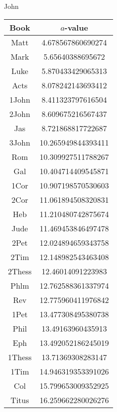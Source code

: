 \documentclass[12pt,letterpaper]{article}
\begin{document}
John
\begin{longtable}{|c|c|}
\hline
 Book & $a$-value \\ \hline
Matt & 4.678567860690274 \\ \hline
 Mark & 5.65640388695672 \\ \hline
 Luke & 5.870433429065313 \\ \hline
 Acts & 8.078242143693412 \\ \hline
 1John & 8.411323797616504 \\ \hline
 2John & 8.609675216567437 \\ \hline
 Jas & 8.721868817722687 \\ \hline
 3John & 10.265949844393411 \\ \hline
 Rom & 10.309927511788267 \\ \hline
 Gal & 10.404714409545871 \\ \hline
 1Cor & 10.907198570530603 \\ \hline
 2Cor & 11.061894508320831 \\ \hline
 Heb & 11.210480742875674 \\ \hline
 Jude & 11.469453846497478 \\ \hline
 2Pet & 12.024894659343758 \\ \hline
 2Tim & 12.148982543463408 \\ \hline
 2Thess & 12.46014091223983 \\ \hline
 Phlm & 12.762588361337974 \\ \hline
 Rev & 12.775960411976842 \\ \hline
 1Pet & 13.477308495380738 \\ \hline
 Phil & 13.49163960435913 \\ \hline
 Eph & 13.492052186245019 \\ \hline
 1Thess & 13.71369308283147 \\ \hline
 1Tim & 14.946319353391026 \\ \hline
 Col & 15.799653009352925 \\ \hline
 Titus & 16.259662280026276 \\ \hline 
\end{longtable}
\end{document}
